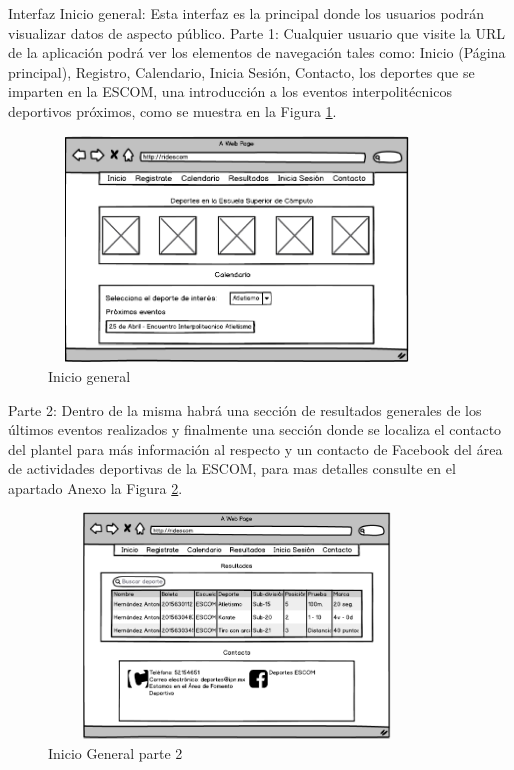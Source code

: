 	\noindent Interfaz Inicio general: Esta interfaz es la principal donde los usuarios podrán visualizar datos de aspecto público. 
	\newline
	Parte 1:
	Cualquier usuario que visite la URL de la aplicación podrá ver los elementos de navegación tales como: Inicio (Página principal), Registro, Calendario, Inicia Sesión, Contacto, los deportes que se imparten en la ESCOM, una introducción a los eventos interpolitécnicos deportivos próximos, como se muestra en la Figura \ref{inicioGeneral}. 
	\newline
	\begin{figure}[hbt!]
		\centering
		\includegraphics[width=10cm, height=6cm]{Imagenes/Disenos/Iniciogeneral}
		\caption{Inicio general}
		\label{inicioGeneral}
	\end{figure}
	
	Parte 2:
	Dentro de la misma habrá una sección de resultados generales de los últimos eventos realizados y finalmente una  sección donde se localiza el contacto del plantel para más información al respecto y un contacto de Facebook del área de actividades deportivas de la ESCOM, para mas detalles consulte en el apartado Anexo la Figura \ref{inicioGeneral1}.
	\pagebreak
	
	\begin{figure}[hbt!]
		\centering
		\includegraphics[width=10cm, height=6cm]{Imagenes/Disenos/Iniciogeneral1}
		\caption{Inicio General parte 2}
		\label{inicioGeneral1}
	\end{figure}
	
